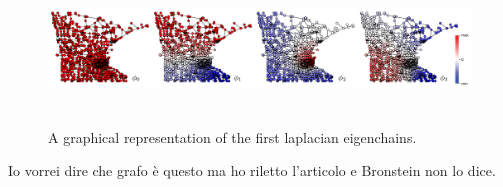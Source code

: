 \documentclass[../2.tex]{subfiles}
\begin{document}
\begin{figure}[H]
    \centering
    \includegraphics[width=17cm, height=4cm]{sections/2/eiglap}
    \caption{A graphical representation of the first laplacian eigenchains.}
    \label{fig:2:5}
\end{figure}

{\color{red} Io vorrei dire che grafo è questo ma ho riletto l'articolo e Bronstein non lo dice.}
\end{document}

